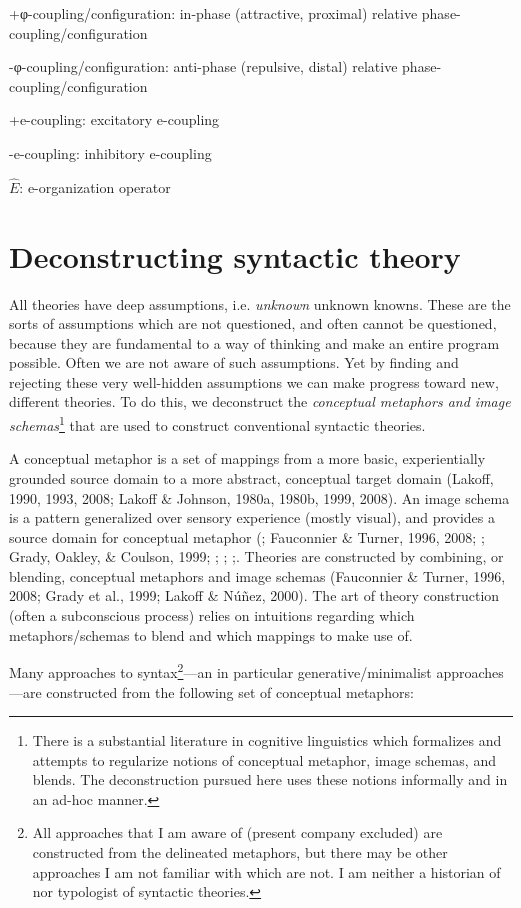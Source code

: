 +φ-coupling/configuration: in-phase (attractive, proximal) relative phase-coupling/configuration

{}-φ-coupling/configuration: anti-phase (repulsive, distal) relative phase-coupling/configuration

+e-coupling: excitatory e-coupling

{}-e-coupling: inhibitory e-coupling

 $\widehat {{E}}$: e-organization operator
\chapter{Deconstructing syntactic theory}

All theories have deep assumptions, i.e. \textit{unknown} unknown knowns. These are the sorts of assumptions which are not questioned, and often cannot be questioned, because they are fundamental to a way of thinking and make an entire program possible. Often we are not aware of such assumptions. Yet by finding and rejecting these very well-hidden assumptions we can make progress toward new, different theories. To do this, we deconstruct the \textit{conceptual metaphors and image schemas}\footnote{There is a substantial literature in cognitive linguistics which formalizes and attempts to regularize notions of conceptual metaphor, image schemas, and blends. The deconstruction pursued here uses these notions informally and in an ad-hoc manner.} that are used to construct conventional syntactic theories. 

  A conceptual metaphor is a set of mappings from a more basic, experientially grounded source domain to a more abstract, conceptual target domain (Lakoff, 1990, 1993, 2008; Lakoff \& Johnson, 1980a, 1980b, 1999, 2008). An image schema is a pattern generalized over sensory experience (mostly visual), and provides a source domain for conceptual metaphor (\citealt{ClausnerCroft1999}; Fauconnier \& Turner, 1996, 2008; \citealt{GibbsColston1995}; Grady, Oakley, \& Coulson, 1999; \citealt{Langacker2002}; \citealt{Oakley2007}; \citealt{Talmy1983,Talmy1988};. Theories are constructed by combining, or blending, conceptual metaphors and image schemas (Fauconnier \& Turner, 1996, 2008; Grady et al., 1999; Lakoff \& Núñez, 2000). The art of theory construction (often a subconscious process) relies on intuitions regarding which metaphors/schemas to blend and which mappings to make use of.

  Many approaches to syntax\footnote{All approaches that I am aware of (present company excluded) are constructed from the delineated metaphors, but there may be other approaches I am not familiar with which are not. I am neither a historian of nor typologist of syntactic theories.}—an in particular generative/minimalist approaches—are constructed from the following set of conceptual metaphors: 

